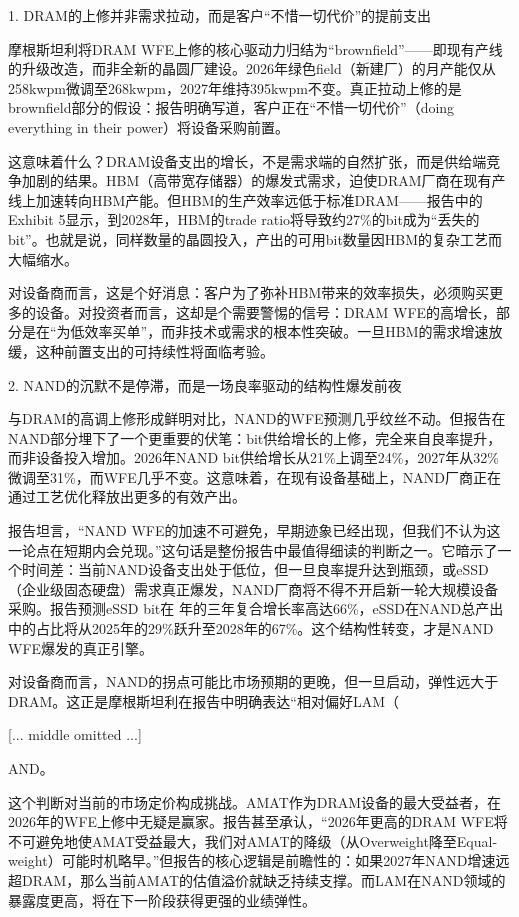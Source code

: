 \documentclass[11pt]{ctexart}
\begin{document}
1. DRAM的上修并非需求拉动，而是客户“不惜一切代价”的提前支出

摩根斯坦利将DRAM WFE上修的核心驱动力归结为“brownfield”——即现有产线的升级改造，而非全新的晶圆厂建设。2026年绿色field（新建厂）的月产能仅从258kwpm微调至268kwpm，2027年维持395kwpm不变。真正拉动上修的是brownfield部分的假设：报告明确写道，客户正在“不惜一切代价”（doing everything in their power）将设备采购前置。

这意味着什么？DRAM设备支出的增长，不是需求端的自然扩张，而是供给端竞争加剧的结果。HBM（高带宽存储器）的爆发式需求，迫使DRAM厂商在现有产线上加速转向HBM产能。但HBM的生产效率远低于标准DRAM——报告中的Exhibit 5显示，到2028年，HBM的trade ratio将导致约27\%的bit成为“丢失的bit”。也就是说，同样数量的晶圆投入，产出的可用bit数量因HBM的复杂工艺而大幅缩水。

对设备商而言，这是个好消息：客户为了弥补HBM带来的效率损失，必须购买更多的设备。对投资者而言，这却是个需要警惕的信号：DRAM WFE的高增长，部分是在“为低效率买单”，而非技术或需求的根本性突破。一旦HBM的需求增速放缓，这种前置支出的可持续性将面临考验。

2. NAND的沉默不是停滞，而是一场良率驱动的结构性爆发前夜

与DRAM的高调上修形成鲜明对比，NAND的WFE预测几乎纹丝不动。但报告在NAND部分埋下了一个更重要的伏笔：bit供给增长的上修，完全来自良率提升，而非设备投入增加。2026年NAND bit供给增长从21\%上调至24\%，2027年从32\%微调至31\%，而WFE几乎不变。这意味着，在现有设备基础上，NAND厂商正在通过工艺优化释放出更多的有效产出。

报告坦言，“NAND WFE的加速不可避免，早期迹象已经出现，但我们不认为这一论点在短期内会兑现。”这句话是整份报告中最值得细读的判断之一。它暗示了一个时间差：当前NAND设备支出处于低位，但一旦良率提升达到瓶颈，或eSSD（企业级固态硬盘）需求真正爆发，NAND厂商将不得不开启新一轮大规模设备采购。报告预测eSSD bit在 年的三年复合增长率高达66\%，eSSD在NAND总产出中的占比将从2025年的29\%跃升至2028年的67\%。这个结构性转变，才是NAND WFE爆发的真正引擎。

对设备商而言，NAND的拐点可能比市场预期的更晚，但一旦启动，弹性远大于DRAM。这正是摩根斯坦利在报告中明确表达“相对偏好LAM（

[... middle omitted ...]

AND。

这个判断对当前的市场定价构成挑战。AMAT作为DRAM设备的最大受益者，在2026年的WFE上修中无疑是赢家。报告甚至承认，“2026年更高的DRAM WFE将不可避免地使AMAT受益最大，我们对AMAT的降级（从Overweight降至Equal-weight）可能时机略早。”但报告的核心逻辑是前瞻性的：如果2027年NAND增速远超DRAM，那么当前AMAT的估值溢价就缺乏持续支撑。而LAM在NAND领域的暴露度更高，将在下一阶段获得更强的业绩弹性。
\end{document}
